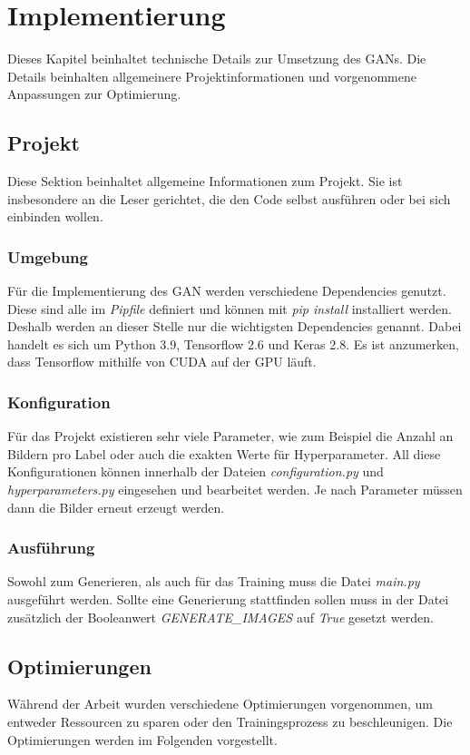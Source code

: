 
\chapter{Implementierung}
Dieses Kapitel beinhaltet technische Details zur Umsetzung des GANs.
Die Details beinhalten allgemeinere Projektinformationen und vorgenommene Anpassungen zur Optimierung.

\section{Projekt}
Diese Sektion beinhaltet allgemeine Informationen zum Projekt.
Sie ist insbesondere an die Leser gerichtet, die den Code selbst ausführen oder bei sich einbinden wollen.

\subsection{Umgebung}
Für die Implementierung des GAN werden verschiedene Dependencies genutzt.
Diese sind alle im \textit{Pipfile} definiert und können mit \textit{pip install} installiert werden.
Deshalb werden an dieser Stelle nur die wichtigsten Dependencies genannt.
Dabei handelt es sich um Python 3.9, Tensorflow 2.6 und Keras 2.8.
Es ist anzumerken, dass Tensorflow mithilfe von CUDA auf der GPU läuft.

\subsection{Konfiguration}
Für das Projekt existieren sehr viele Parameter, wie zum Beispiel die Anzahl an Bildern pro Label oder auch die exakten Werte für Hyperparameter.
All diese Konfigurationen können innerhalb der Dateien \textit{configuration.py} und \textit{hyperparameters.py} eingesehen und bearbeitet werden.
Je nach Parameter müssen dann die Bilder erneut erzeugt werden.

\subsection{Ausführung}
Sowohl zum Generieren, als auch für das Training muss die Datei \textit{main.py} ausgeführt werden.
Sollte eine Generierung stattfinden sollen muss in der Datei zusätzlich der Booleanwert \textit{GENERATE\_IMAGES} auf \textit{True} gesetzt werden.

\section{Optimierungen}
Während der Arbeit wurden verschiedene Optimierungen vorgenommen, um entweder Ressourcen zu sparen oder den Trainingsprozess zu beschleunigen.
Die Optimierungen werden im Folgenden vorgestellt.

